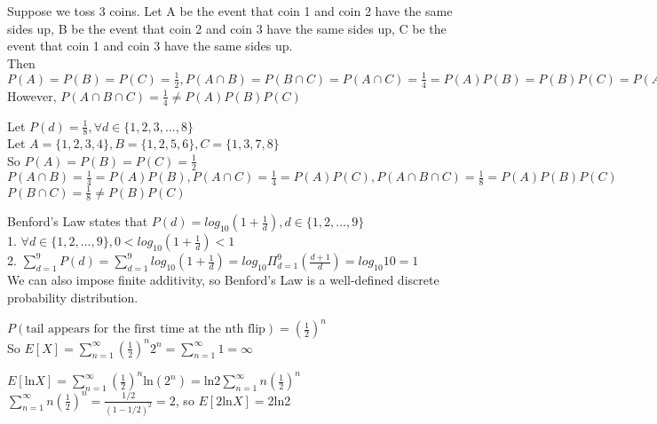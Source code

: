 \documentclass[12pt]{article}
\newenvironment{problem}[2][Problem]{\begin{trivlist}
\item[\hskip \labelsep {\bfseries #1}\hskip \labelsep {\bfseries #2.}]}{\end{trivlist}}
\begin{document}
\begin{problem}{2(a)}\hfill\linebreak
Suppose we toss 3 coins. Let A be the event that coin 1 and coin 2 have the same sides up, B be the event that coin 2 and coin 3 have the same sides up, C be the event that coin 1 and coin 3 have the same sides up.\\
Then $P(A)=P(B)=P(C)=\frac{1}{2},P(A\cap B)=P(B\cap C)=P(A\cap C)=\frac{1}{4}=P(A)P(B)=P(B)P(C)=P(A)P(C)$\\
However, $P(A\cap B\cap C)=\frac{1}{4}\neq P(A)P(B)P(C)$
\end{problem}

\begin{problem}{2(b)}\hfill\linebreak
Let $P(d)=\frac{1}{8},\forall d\in\{1,2,3,...,8\}$\\
Let $A=\{1,2,3,4\}, B=\{1,2,5,6\}, C=\{1,3,7,8\}$\\
So $P(A)=P(B)=P(C)=\frac{1}{2}$\\
$P(A\cap B)=\frac{1}{4}=P(A)P(B), P(A\cap C)=\frac{1}{4}=P(A)P(C), P(A\cap B\cap C)=\frac{1}{8}=P(A)P(B)P(C)$\\
$P(B\cap C)=\frac{1}{8}\neq P(B)P(C)$
\end{problem}

\begin{problem}{3}\hfill\linebreak
Benford's Law states that $P(d)=log_{10}(1+\frac{1}{d}), d\in\{1,2,...,9\}$\\
1. $\forall d\in\{1,2,...,9\}, 0<log_{10}(1+\frac{1}{d})<1$\\
2. $\sum_{d=1}^9 P(d)=\sum_{d=1}^9 log_{10} (1+\frac{1}{d})=log_{10}\Pi_{d=1}^9(\frac{d+1}{d})=log_{10}10=1$\\
We can also impose finite additivity, so Benford's Law is a well-defined discrete probability distribution.
\end{problem}

\begin{problem}{4(a)}\hfill\linebreak
$P(\text{tail appears for the first time at the nth flip})=(\frac{1}{2})^n$\\
So $E[X]=\sum_{n=1}^\infty (\frac{1}{2})^n 2^n=\sum_{n=1}^\infty 1=\infty$
\end{problem}

\begin{problem}{4(b)}\hfill\linebreak
$E[\text{ln}X]=\sum_{n=1}^\infty (\frac{1}{2})^n \text{ln}(2^n)=\text{ln}2\sum_{n=1}^\infty n(\frac{1}{2})^n$\\
$\sum_{n=1}^\infty n(\frac{1}{2})^n=\frac{1/2}{(1-1/2)^2}=2$, so $E[2\text{ln}X]=$2ln2
\end{problem}
\end{document}
